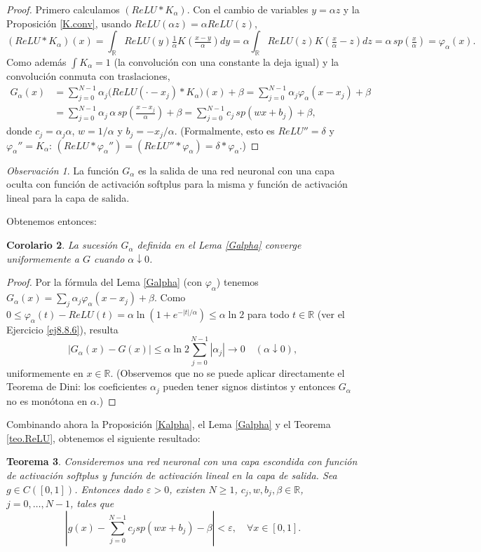 \documentclass[12pt, a4paper]{amsbook}
\newcommand{\ve}{\varepsilon}
\newcommand{\R}{{\mathbb R}}
\newtheorem{teo}{Teorema}[section]
\newtheorem{cor}[teo]{Corolario}
\theoremstyle{remark}
\newtheorem{obs}[teo]{Observaci\'on}
\theoremstyle{definition}
\numberwithin{section}{chapter}
\numberwithin{subsection}{section}
\numberwithin{equation}{section}
\numberwithin{figure}{chapter}
\begin{document}
\begin{proof}
Primero calculamos $(ReLU*K_\alpha)$. Con el cambio de variables $y=\alpha z$ y la Proposición \ref{K.conv}, usando $ReLU(\alpha z)=\alpha ReLU(z)$,
$$
(ReLU*K_\alpha)(x)=\int_\R ReLU(y)\tfrac1\alpha K\!\left(\tfrac{x-y}{\alpha}\right)dy=\alpha\int_\R ReLU(z)K\!\left(\tfrac x\alpha-z\right)dz=\alpha\, sp\!\left(\tfrac x\alpha\right)=\varphi_\alpha(x).
$$
Como además $\int K_\alpha=1$ (la convolución con una constante la deja igual) y la convolución conmuta con traslaciones,
\begin{align*}
G_\alpha(x) &= \sum_{j=0}^{N-1}\alpha_j \big(ReLU(\cdot - x_j)*K_\alpha\big)(x) + \beta
= \sum_{j=0}^{N-1}\alpha_j \varphi_\alpha(x-x_j) + \beta\\
&=\sum_{j=0}^{N-1}\alpha_j\, \alpha\, sp\!\left(\frac{x-x_j}{\alpha}\right) + \beta = \sum_{j=0}^{N-1}c_j\,sp(wx+b_j) + \beta,
\end{align*}
donde $c_j = \alpha_j \alpha$, $w=1/\alpha$ y $b_j = -x_j/\alpha$. (Formalmente, esto es $ReLU''=\delta$ y $\varphi_\alpha''=K_\alpha$: $(ReLU*\varphi_\alpha'')=(ReLU''*\varphi_\alpha)=\delta*\varphi_\alpha$.)
\end{proof}

\begin{obs}
La función $G_\alpha$ es la salida de una red neuronal con una capa oculta con función de activación softplus para la misma y función de activación lineal para la capa de salida.
\end{obs}

Obtenemos entonces:
\begin{cor}\label{corGalpha}
La sucesión $G_\alpha$ definida en el Lema \ref{Galpha} converge uniformemente a $G$ cuando $\alpha\downarrow 0$.
\end{cor}

\begin{proof}
Por la fórmula del Lema \ref{Galpha} (con $\varphi_\alpha$) tenemos $G_\alpha(x)=\sum_j\alpha_j\varphi_\alpha(x-x_j)+\beta$. Como $0\le\varphi_\alpha(t)-ReLU(t)=\alpha\ln(1+e^{-|t|/\alpha})\le\alpha\ln2$ para todo $t\in\R$ (ver el Ejercicio \ref{ej8.8.6}), resulta
$$
|G_\alpha(x)-G(x)|\le \alpha\ln 2\sum_{j=0}^{N-1}|\alpha_j|\longrightarrow0\quad(\alpha\downarrow0),
$$
uniformemente en $x\in\R$. (Observemos que no se puede aplicar directamente el Teorema de Dini: los coeficientes $\alpha_j$ pueden tener signos distintos y entonces $G_\alpha$ no es monótona en $\alpha$.)
\end{proof}

Combinando ahora la Proposición \ref{Kalpha}, el Lema \ref{Galpha} y el Teorema \ref{teo.ReLU}, obtenemos el siguiente resultado:
\begin{teo}
Consideremos una red neuronal con una capa escondida con función de activación softplus y función de activación lineal en la capa de salida. Sea $g\in C([0,1])$. Entonces dado $\ve>0$, existen $N\ge 1$, $c_j,  w, b_j, \beta\in\R$, $j=0, \dots, N-1$, tales que
$$
\left| g(x) - \sum_{j=0}^{N-1} c_j sp(w x + b_j) - \beta\right| < \ve,\quad \forall x\in [0, 1].
$$
\end{teo}
\end{document}
